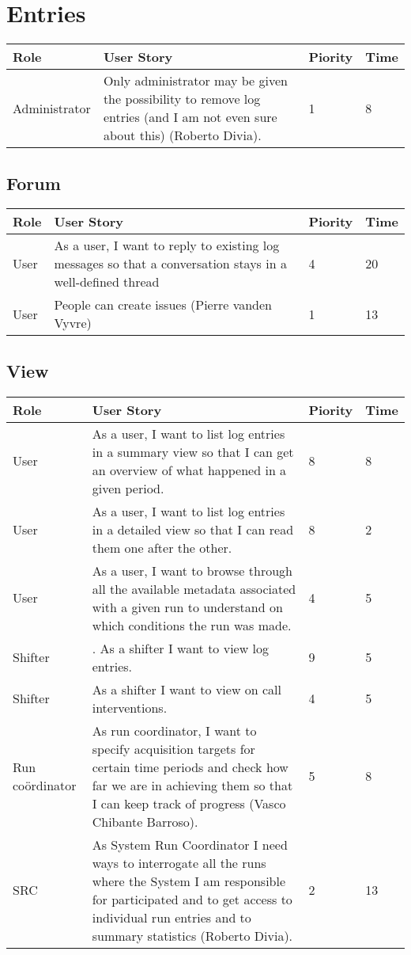
\section{Entries}
\begin{longtable}{ | p{2cm} | p{8cm} | p{1.5cm} | l |}
\hline
Role & User Story & Piority & Time \\ \hline
Administrator &  Only administrator may be given the possibility to remove log entries
(and I am not even sure about this) (Roberto Divia). & 1 & 8 \\ \hline
\end{longtable}

\subsection{Forum}
\begin{longtable}{ | p{2cm} | p{8cm} | p{1.5cm} | l |}
\hline
Role & User Story & Piority & Time \\ \hline
User &  As a user, I want to reply to existing log messages so that a conversation stays in a well-defined thread & 4 & 20 \\ \hline
User &  People can create issues (Pierre vanden Vyvre) & 1 & 13 \\ \hline


\end{longtable}

\subsection{View}
\begin{longtable}{ | p{2cm} | p{8cm} | p{1.5cm} | l |}
\hline
Role & User Story & Piority & Time \\ \hline
User &  As a user, I want to list log entries in a summary view so that I can
get an overview of what happened in a given period. & 8 & 8 \\ \hline
User &  As a user, I want to list log entries in a detailed view so that I can read them one after the other. & 8 & 2 \\ \hline
User &  As a user, I want to browse through all the available metadata associated with a given run to understand on which conditions the run was made. & 4 & 5 \\ \hline
Shifter & . As a shifter I want to view log entries. & 9 & 5 \\ \hline
Shifter &  As a shifter I want to view on call interventions. & 4 & 5 \\ \hline
Run coördinator &  As run coordinator, I want to specify acquisition targets for certain
time periods and check how far we are in achieving them so that I can
keep track of progress (Vasco Chibante Barroso). & 5 & 8 \\ \hline
SRC &  As System Run Coordinator I need ways to interrogate all the runs where the System I am responsible for participated and to get access to individual run entries and to summary statistics (Roberto Divia). & 2 & 13 \\ \hline
\end{longtable}

